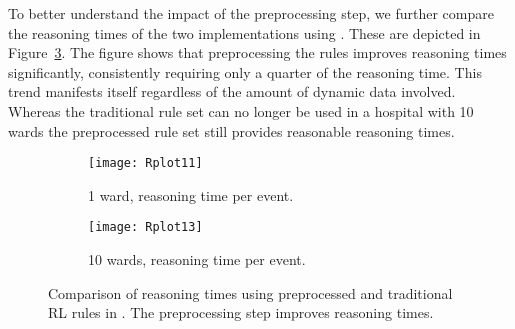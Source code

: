 To better understand the impact of the preprocessing step, we further compare the reasoning times of the two implementations using \nthree. These are depicted 
in Figure~\ref{figure:results}.
The figure shows that preprocessing the rules improves reasoning times significantly,  consistently requiring only a quarter of the reasoning time.
This trend manifests itself regardless of the amount of dynamic data involved.
Whereas the traditional rule set can no longer be used in a hospital with 10 wards the 
preprocessed rule set still provides reasonable reasoning times. 
 \begin{figure}
\centering
\begin{subfigure}{.5\textwidth}
  \centering
  \texttt{[image: Rplot11]}
  \caption{1 ward, reasoning time per event.}
  \label{fig:results1ward}
\end{subfigure}%
\begin{subfigure}{.5\textwidth}
  \centering
  \texttt{[image: Rplot13]}
  \caption{10 wards, reasoning time per event.}
  \label{fig:results10ward}
\end{subfigure}
\caption{Comparison of reasoning times using preprocessed and traditional RL rules in \nthree. The preprocessing step improves reasoning times.}
\label{figure:results}
\end{figure} 
 
